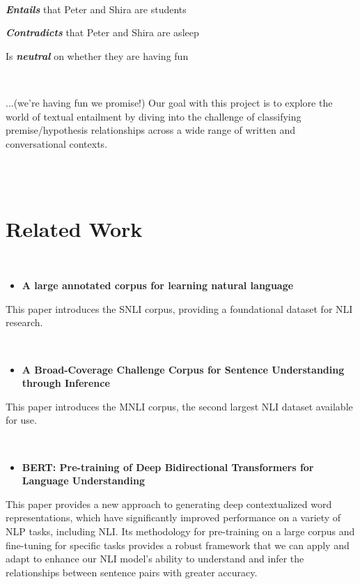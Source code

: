 \documentclass[11pt,a4paper]{article}
\begin{document}
\

\textbf{\textit{Entails }}that Peter and Shira are students

\textbf{\textit{Contradicts }}that Peter and Shira are asleep

Is \textbf{\textit{neutral }}on whether they are having fun

\

...(we're having fun we promise!) Our goal with this project is to explore the world of textual entailment by diving into the challenge of classifying premise/hypothesis relationships across a wide range of written and conversational contexts. 

\\~\\

\section{Related Work}

\

\begin{itemize}
    \item \textbf{A large annotated corpus for learning natural language }
\end{itemize}
This paper introduces the SNLI corpus, providing a foundational dataset for NLI research.

\
\
\

\begin{itemize}
    \item \textbf{A Broad-Coverage Challenge Corpus for Sentence Understanding through Inference }
\end{itemize}
This paper introduces the MNLI corpus, the second largest NLI dataset available for use.

\
\

\begin{itemize}
    \item \textbf{BERT: Pre-training of Deep Bidirectional Transformers for Language Understanding }
\end{itemize}
This paper provides a new approach to generating deep contextualized word representations,                   which have significantly improved performance on a variety of NLP tasks, including NLI. Its                      methodology for pre-training on a large corpus and fine-tuning for specific tasks provides a robust          framework that we can apply and adapt to enhance our NLI model's ability to understand and                  infer the relationships between sentence pairs with greater accuracy.
    
\end{document}
